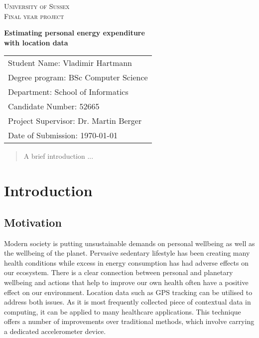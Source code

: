 \documentclass[12pt, a4paper]{report}   %
\begin{document}
\begin{center}

\textsc{\large University of Sussex}\\[1.5cm]
\textsc{Final year project}\\[2cm]

\begin{spacing}{2.5}
{\Large \bfseries Estimating personal energy expenditure \\ with location data}\\[5 cm]
\end{spacing}
\end{center}
\vfill

\begin{spacing}{1.5}
\begin{tabular}{l}
Student Name: Vladimir Hartmann \\
Degree program: BSc Computer Science \\
Department: School of Informatics \\
Candidate Number: 52665 \\
Project Supervisor: Dr. Martin Berger \\
Date of Submission: {\today}
\end{tabular}
\end{spacing}
\thispagestyle{empty}


\begin{abstract}
  A brief introduction ...
\end{abstract}

\tableofcontents
\thispagestyle{empty}

\clearpage
{}
\chapter{Introduction}

\section{Motivation}
Modern society is putting unsustainable demands on personal wellbeing as well as the wellbeing of the planet. Pervasive sedentary lifestyle has been creating many health conditions while excess in energy consumption has had adverse effects on our ecosystem. There is a clear connection between personal and planetary wellbeing and actions that help to improve our own health often have a positive effect on our environment. Location data such as GPS tracking can be utilised to address both issues. As it is most frequently collected piece of contextual data in computing, it can be applied to many healthcare applications. This technique offers a number of improvements over traditional methods, which involve carrying a dedicated accelerometer device.
\end{document}

